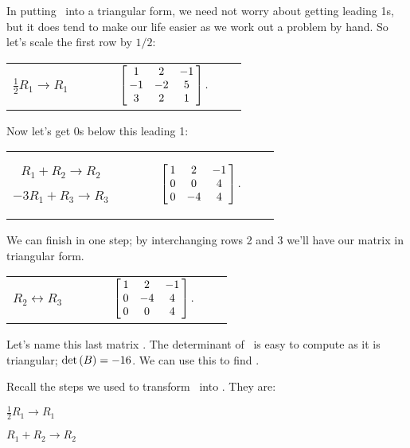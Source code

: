 {In putting \tta\ into a triangular form, we need not worry about getting leading 1s, but it does tend to make our life easier as we work out a problem by hand. So let's scale the first row by $1/2$:

\begin{center}\begin{tabular}{ccc}
\parbox{70pt}{\centering\small $\frac 12R_1 \rightarrow R_1$}
&$\quad \quad$&
$\bmx{ccc}1&2&-1\\-1&-2&5\\3&2&1\emx.$
\end{tabular}\end{center}

Now let's get 0s below this leading 1:

\begin{center}\begin{tabular}{ccc}
\parbox{70pt}{\centering\small $R_1 + R_2 \rightarrow R_2$

$-3R_1+R_3\rightarrow R_3$}
&$\quad \quad$&
$\bmx{ccc} 1&2&-1\\0&0&4\\0&-4&4\emx.$
\end{tabular}\end{center}

We can finish in one step; by interchanging rows 2 and 3 we'll have our matrix in triangular form.

\begin{center}\begin{tabular}{ccc}
\parbox{70pt}{\centering\small $R_2  \leftrightarrow R_3$
}
&$\quad \quad$&
$\bmx{ccc} 1&2&-1\\0&-4&4\\0&0&4\emx.$
\end{tabular}\end{center}

Let's name this last matrix \ttb. The determinant of \ttb\ is easy to compute as it is triangular; $\det\ttb = -16$. We can use this to find \det\tta. 

Recall the steps we used to transform \tta\ into \ttb. They are:

\begin{center}
$\frac 12R_1 \rightarrow R_1$

$R_1 + R_2 \rightarrow R_2$


\end{center}}
